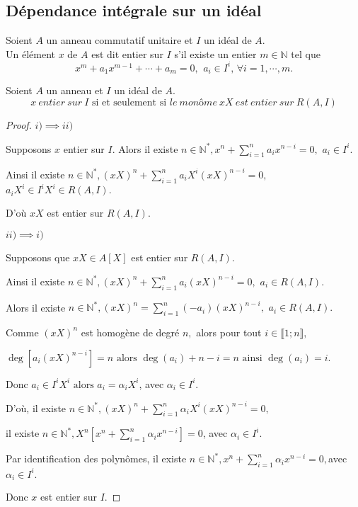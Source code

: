 \subsection{Dépendance intégrale sur un idéal}
\begin{madefinition}
	Soient $A$ un anneau commutatif unitaire et $I$ un idéal de $A$.\\ Un élément $x$ de $A$ est dit entier sur $I$ s'il existe un entier $m \in \mathbb{N}$ tel que  
	\[ 	x^m + a_1 x^{m-1} + \cdots + a_m = 0\text{, } \ a_i \in I^i,\, \forall i=1, \cdots ,m. \]	
\end{madefinition}
\begin{maproposition}
	Soient $A$ un anneau et $I$ un idéal de $A$.
	\[ x \ entier \ sur \ I \text{ si et seulement si } le \ monôme \ xX  \ est \ entier \ sur \ R(A, I) \]
\end{maproposition}
\begin{proof}
	$i) \implies ii)$
	
	Supposons $x$ entier sur $I.$ Alors il existe $n\in \mathbb{N}^{\ast },x^{n}+\sum\limits_{i=1}^{n}a_{i}x^{n-i}=0,$ $a_{i}\in I^{i}.$
	
	Ainsi il existe $n\in \mathbb{N}^{\ast },(xX)^{n}+\sum\limits_{i=1}^{n}a_{i}X^{i}(xX)^{n-i}=0,$ $
	a_{i}X^{i}\in I^{i}X^{i}\in R(A,I).$
	
	D’où $xX$ est entier sur $R(A,I).$
	
	$ii)\implies i)$
	
	Supposons que  $xX\in A[X]$ est entier sur $R(A,I).$
	
	Ainsi il existe $n\in \mathbb{N}^{\ast },(xX)^{n}+\sum\limits_{i=1}^{n}a_{i}(xX)^{n-i}=0,$ $a_{i}\in R(A,I).
	$
	
	Alors il existe $n\in \mathbb{N}^{\ast },(xX)^{n}=\sum\limits_{i=1}^{n}(-a_{i})(xX)^{n-i},$ $a_{i}\in
	R(A,I).$
	
	Comme $(xX)^{n}$ est homogène de degré $n,$ alors pour tout $i\in \llbracket 1; n \rrbracket,$
	
	$\deg [a_{i}(xX)^{n-i}]=n\text{ alors } \deg (a_{i})+n-i=n\text{ ainsi } \deg
	(a_{i})=i.$
	
	Donc $a_{i}\in I^{i}X^{i}\text{ alors } a_{i}=\alpha _{i}X^{i}$, avec $\alpha
	_{i}\in I^{i}.$
	
	D’où, il existe $n\in \mathbb{N}^{\ast },(xX)^{n}+\sum\limits_{i=1}^{n}\alpha _{i}X^{i}(xX)^{n-i}=0,$
	
	il existe $n\in \mathbb{N}^{\ast },X^{n}[x^{n}+\sum\limits_{i=1}^{n}\alpha _{i}x^{n-i}]=0$, avec $\alpha _{i}\in I^{i}.$
	
	Par identification des polynômes, il existe $n\in \mathbb{N}^{\ast },x^{n}+\sum\limits_{i=1}^{n}\alpha _{i}x^{n-i}=0,$avec $\alpha_{i}\in I^{i}.$
	
	Donc $x$ est entier sur $I.$
\end{proof}
